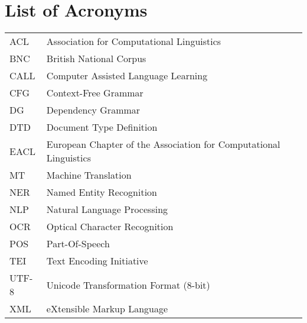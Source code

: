 {}
\chapter*{List of Acronyms}

\begin{supertabular}{lp{12.5cm}}
ACL & Association for Computational Linguistics\\
BNC & British National Corpus\\
CALL & Computer Assisted Language Learning\\
CFG & Context-Free Grammar\\
DG & Dependency Grammar \\
DTD & Document Type Definition\\
EACL & European Chapter of the Association for Computational Linguistics\\
MT & Machine Translation\\
NER & Named Entity Recognition\\
NLP & Natural Language Processing\\
OCR & Optical Character Recognition\\
POS & Part-Of-Speech\\
TEI & Text Encoding Initiative\\
UTF-8 & Unicode Transformation Format (8-bit)\\
XML & eXtensible Markup Language\\
\end{supertabular}

\newpage